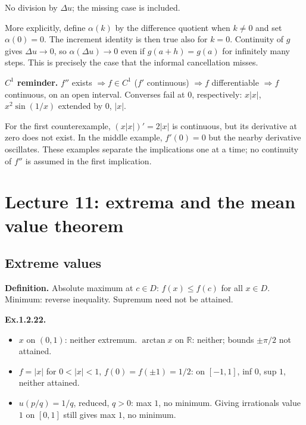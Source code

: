 \documentclass[11pt,a4paper]{article}
\begin{document}
No division by \(\Delta u\); the missing case is included.

More explicitly, define \(\alpha(k)\) by the difference quotient when
\(k\ne0\) and set \(\alpha(0)=0\). The increment identity is then true
also for \(k=0\). Continuity of \(g\) gives \(\Delta u\to0\), so
\(\alpha(\Delta u)\to0\) even if \(g(a+h)=g(a)\) for infinitely many
steps. This is precisely the case that the informal cancellation misses.

\textbf{\(C^1\) reminder.} \(f''\) exists \(\Rightarrow f\in C^1\)
(\(f'\) continuous) \(\Rightarrow f\) differentiable \(\Rightarrow f\)
continuous, on an open interval. Converses fail at \(0\), respectively:
\(x|x|\), \(x^2\sin(1/x)\) extended by \(0\), \(|x|\).

For the first counterexample, \((x|x|)'=2|x|\) is continuous, but its
derivative at zero does not exist. In the middle example, \(f'(0)=0\)
but the nearby derivative oscillates. These examples separate the
implications one at a time; no continuity of \(f''\) is assumed in the
first implication.

\section{Lecture 11: extrema and the mean value
theorem}\label{lecture-11-extrema-and-the-mean-value-theorem}

\subsection{Extreme values}\label{extreme-values}

\textbf{Definition.} Absolute maximum at \(c\in D\): \(f(x)\le f(c)\)
for all \(x\in D\). Minimum: reverse inequality. Supremum need not be
attained.

\textbf{Ex.1.2.22.}

\begin{itemize}
\item
  \(x\) on \((0,1)\): neither extremum. \(\arctan x\) on \(\mathbb R\):
  neither; bounds \(\pm\pi/2\) not attained.
\item
  \(f=|x|\) for \(0<|x|<1\), \(f(0)=f(\pm1)=1/2\): on \([-1,1]\), inf
  \(0\), sup \(1\), neither attained.
\item
  \(u(p/q)=1/q\), reduced, \(q>0\): max \(1\), no minimum. Giving
  irrationals value \(1\) on \([0,1]\) still gives max \(1\), no
  minimum.
\end{itemize}
\end{document}
